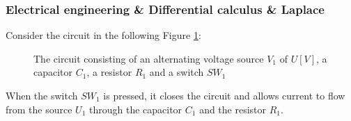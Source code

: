 \documentclass[a4paper, 10pt, final]{article} %
\begin{document}
    \subsubsection{Electrical engineering \& Differential calculus \& Laplace} \label{sec:ElectronicsCalculusLaplace}
    Consider the circuit in the following Figure \ref{fig:CapTrasferFunctionExampleSchematic}:
    \begin{figure}[H]
        \centering
        \caption{The circuit consisting of an alternating voltage source $V_1$ of $U[V]$, a capacitor $C_1$, a resistor $R_1$ and a switch $SW_1$}
        \label{fig:CapTrasferFunctionExampleSchematic}
    \end{figure}
    \noindent When the switch $SW_1$ is pressed, it closes the circuit and allows current to flow from the source $U_1$ through the capacitor $C_1$ and the resistor $R_1$.
\end{document}
